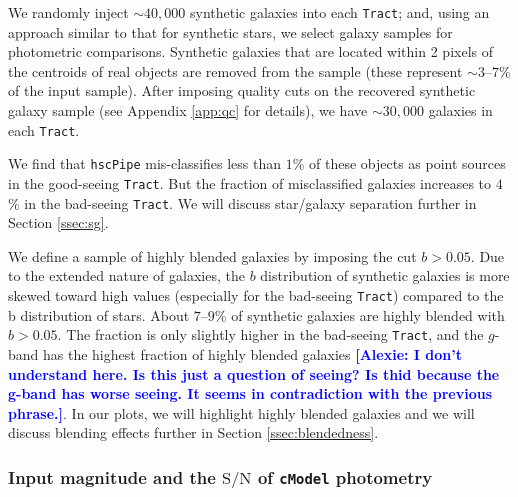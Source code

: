 \documentclass[useamsfonts]{pasj01}
\def\asec{$^{\prime\prime}$}
\newcommand{\alexie}[1]{\textcolor{blue}{\textbf{[Alexie: #1]}}}
\def\hscpipe{\texttt{hscPipe}}
\def\cmodel{\texttt{cModel}}
\def\tract{\texttt{Tract}}
\def\s2n{{$\mathrm{S}/\mathrm{N}$}}
\begin{document}
    We randomly inject ${\sim}40,000$ synthetic galaxies into each
    \tract{}; and, using an approach similar to that for synthetic stars, we select 
    galaxy samples for photometric comparisons. Synthetic galaxies that are located within 2 pixels 
    of the centroids of real objects are removed from the sample  (these represent ${\sim}3$--$7$\% of the input sample). After imposing quality cuts on the  recovered synthetic galaxy sample (see Appendix \ref{app:qc} for details), we have ${\sim}30,000$
    galaxies in each \tract{}.
    
    We find that \hscpipe{} mis-classifies less than $1$\% of these objects as point sources
    in the good-seeing \tract{}.
    But the fraction of misclassified galaxies increases to $4$\% in the
    bad-seeing \tract{}. We will discuss star/galaxy separation further in Section \ref{ssec:sg}.

    We define a sample of highly blended galaxies  by imposing the cut $b>0.05$.
    Due to the extended nature of galaxies, the $b$ distribution of synthetic 
    galaxies is more skewed toward high values (especially for the bad-seeing \tract{}) compared to the b distribution of stars.
    About $7$--$9$\% of synthetic galaxies are highly blended with $b>0.05$.
    The fraction is only slightly higher in the bad-seeing \tract{}, and the
    $g$-band has the highest fraction of highly blended galaxies \alexie{I don't understand here. Is this just a question of seeing? Is thid because the g-band has worse seeing. It seems in contradiction with the previous phrase.}. In our plots, we will highlight highly blended galaxies and we will discuss blending effects further in Section \ref{ssec:blendedness}.


\subsubsection{Input magnitude and the \s2n{} of \cmodel{} photometry}
\end{document}

